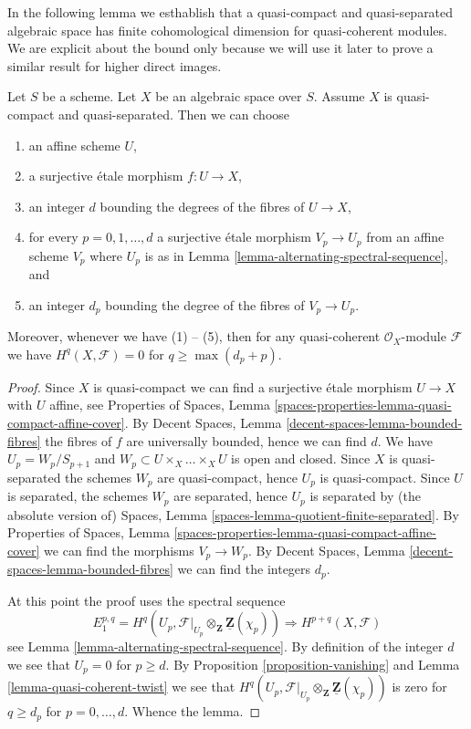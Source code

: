 \noindent
In the following lemma we esthablish that a quasi-compact and
quasi-separated algebraic space has finite cohomological dimension
for quasi-coherent modules. We are explicit about the bound only because
we will use it later to prove a similar result for higher direct
images.

\begin{lemma}
\label{lemma-vanishing-quasi-separated}
Let $S$ be a scheme. Let $X$ be an algebraic space over $S$.
Assume $X$ is quasi-compact and quasi-separated.
Then we can choose
\begin{enumerate}
\item an affine scheme $U$,
\item a surjective \'etale morphism $f : U \to X$,
\item an integer $d$ bounding the degrees of the fibres of $U \to X$,
\item for every $p = 0, 1, \ldots, d$ a surjective \'etale morphism
$V_p \to U_p$ from an affine scheme $V_p$ where $U_p$ is as in
Lemma \ref{lemma-alternating-spectral-sequence}, and
\item an integer $d_p$ bounding the degree of the fibres of $V_p \to U_p$.
\end{enumerate}
Moreover, whenever we have (1) -- (5), then for any quasi-coherent
$\mathcal{O}_X$-module $\mathcal{F}$ we have $H^q(X, \mathcal{F}) = 0$ for
$q \geq \max(d_p + p)$.
\end{lemma}

\begin{proof}
Since $X$ is quasi-compact we can find a surjective \'etale morphism
$U \to X$ with $U$ affine, see
Properties of Spaces, Lemma
\ref{spaces-properties-lemma-quasi-compact-affine-cover}.
By
Decent Spaces, Lemma \ref{decent-spaces-lemma-bounded-fibres}
the fibres of $f$ are universally bounded, hence we can find $d$.
We have $U_p = W_p/S_{p + 1}$ and $W_p \subset U \times_X \ldots \times_X U$
is open and closed. Since $X$ is quasi-separated the schemes
$W_p$ are quasi-compact, hence $U_p$ is quasi-compact.
Since $U$ is separated, the schemes $W_p$ are separated, hence
$U_p$ is separated by (the absolute version of)
Spaces, Lemma \ref{spaces-lemma-quotient-finite-separated}.
By
Properties of Spaces, Lemma
\ref{spaces-properties-lemma-quasi-compact-affine-cover}
we can find the morphisms $V_p \to W_p$.
By
Decent Spaces, Lemma \ref{decent-spaces-lemma-bounded-fibres}
we can find the integers $d_p$.

\medskip\noindent
At this point the proof uses the spectral sequence
$$
E_1^{p, q} =
H^q(U_p, \mathcal{F}|_{U_p} \otimes_\mathbf{Z} \underline{\mathbf{Z}}(\chi_p))
\Rightarrow
H^{p + q}(X, \mathcal{F})
$$
see
Lemma \ref{lemma-alternating-spectral-sequence}.
By definition of the integer $d$ we see that $U_p = 0$ for $p \geq d$.
By Proposition \ref{proposition-vanishing}
and
Lemma \ref{lemma-quasi-coherent-twist}
we see that
$H^q(U_p,
\mathcal{F}|_{U_p} \otimes_\mathbf{Z} \underline{\mathbf{Z}}(\chi_p))$
is zero for $q \geq d_p$ for $p = 0, \ldots, d$.
Whence the lemma.
\end{proof}









